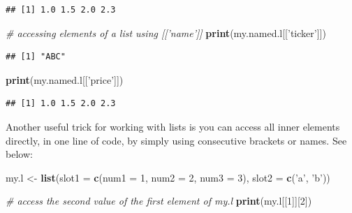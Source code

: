 \documentclass[11pt,]{book}
\newenvironment{Shaded}{\begin{snugshade}}{\end{snugshade}}
\newcommand{\KeywordTok}[1]{\textcolor[rgb]{0.27,0.27,0.27}{\textbf{#1}}}
\newcommand{\DataTypeTok}[1]{\textcolor[rgb]{0.27,0.27,0.27}{#1}}
\newcommand{\DecValTok}[1]{\textcolor[rgb]{0.06,0.06,0.06}{#1}}
\newcommand{\StringTok}[1]{\textcolor[rgb]{0.5,0.5,0.5}{#1}}
\newcommand{\CommentTok}[1]{\textcolor[rgb]{0.56,0.35,0.01}{\textit{#1}}}
\newcommand{\OperatorTok}[1]{\textcolor[rgb]{0.81,0.36,0.00}{\textbf{#1}}}
\newcommand{\NormalTok}[1]{#1}
\begin{document}
\begin{Shaded}
\end{Shaded}

\begin{verbatim}
## [1] 1.0 1.5 2.0 2.3
\end{verbatim}

\begin{Shaded}
\begin{Highlighting}[]
\CommentTok{# accessing elements of a list using [['name']]}
\KeywordTok{print}\NormalTok{(my.named.l[[}\StringTok{'ticker'}\NormalTok{]])}
\end{Highlighting}
\end{Shaded}

\begin{verbatim}
## [1] "ABC"
\end{verbatim}

\begin{Shaded}
\begin{Highlighting}[]
\KeywordTok{print}\NormalTok{(my.named.l[[}\StringTok{'price'}\NormalTok{]])}
\end{Highlighting}
\end{Shaded}

\begin{verbatim}
## [1] 1.0 1.5 2.0 2.3
\end{verbatim}

Another useful trick for working with lists is you can access all inner
elements directly, in one line of code, by simply using consecutive
brackets or names. See below:

\begin{Shaded}
\begin{Highlighting}[]
\NormalTok{my.l <-}\StringTok{ }\KeywordTok{list}\NormalTok{(}\DataTypeTok{slot1 =} \KeywordTok{c}\NormalTok{(}\DataTypeTok{num1 =} \DecValTok{1}\NormalTok{, }\DataTypeTok{num2 =} \DecValTok{2}\NormalTok{, }\DataTypeTok{num3 =} \DecValTok{3}\NormalTok{), }
             \DataTypeTok{slot2 =} \KeywordTok{c}\NormalTok{(}\StringTok{'a'}\NormalTok{, }\StringTok{'b'}\NormalTok{))}

\CommentTok{# access the second value of the first element of my.l}
\KeywordTok{print}\NormalTok{(my.l[[}\DecValTok{1}\NormalTok{]][}\DecValTok{2}\NormalTok{])}
\end{Highlighting}
\end{Shaded}
\end{document}

